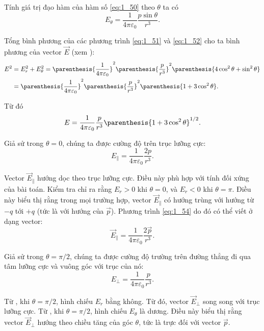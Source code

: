 \noindent
Tính giá trị đạo hàm của hàm số \eqref{eq:1_50} theo $\theta$ ta có
\begin{equation}\label{eq:1_52}
	E_{\theta} = \frac{1}{4\pi\varepsilon_0} \frac{p\sin\theta}{r^3}.
\end{equation}

\noindent
Tổng bình phương của các phương trình \eqref{eq:1_51} và \eqref{eq:1_52} cho ta bình phương của vector $\vec{E}$ (xem ):
\begin{align*}
	E^2 &= E_r^2 + E_{\theta}^2 = \parenthesis{\frac{1}{4\pi\varepsilon_0}}^2 \parenthesis{\frac{p}{r^3}}^2 \parenthesis{4\cos^2\theta + \sin^2\theta}\\
		&= \parenthesis{\frac{1}{4\pi\varepsilon_0}}^2 \parenthesis{\frac{p}{r^3}}^2 \parenthesis{1 + 3\cos^2\theta}.
\end{align*}

\noindent
Từ đó
\begin{equation}\label{eq:1_53}
	E = \frac{1}{4\pi\varepsilon_0} \frac{p}{r^3} \parenthesis{1 + 3\cos^2\theta}^{1/2}.
\end{equation}

Giả sử trong  $\theta=0$, chúng ta được cường độ trên trục lưỡng cực:
\begin{equation}\label{eq:1_54}
	E_{\parallel} = \frac{1}{4\pi\varepsilon_0} \frac{2p}{r^3}.
\end{equation}

\noindent
Vector $\vec{E}_{\parallel}$ hướng dọc theo trục lưỡng cực. Điều này phù hợp với tính đối xứng của bài toán. Kiểm tra  chỉ ra rằng $E_r>0$ khi $\theta=0$, và $E_r<0$ khi $\theta=\pi$. Điều này biểu thị rằng trong mọi trường hợp, vector $\vec{E}_{\parallel}$ có hướng trùng với hướng từ $-q$ tới $+q$ (tức là với hướng của $\vec{p}$). Phương trình \eqref{eq:1_54} do đó có thể viết ở dạng vector:
\begin{equation}\label{eq:1_55}
	\vec{E}_{\parallel} = \frac{1}{4\pi\varepsilon_0} \frac{2\vec{p}}{r^3}.
\end{equation}

Giả sử trong  $\theta=\pi/2$, chúng ta được cường độ trường trên đường thẳng đi qua tâm lưỡng cực và vuông góc với trục của nó:
\begin{equation}\label{eq:1_56}
	E_{\perp} = \frac{1}{4\pi\varepsilon_0} \frac{p}{r^3}.
\end{equation}

\noindent
Từ , khi $\theta=\pi/2$, hình chiếu $E_r$ bằng không. Từ đó, vector $\vec{E}_{\perp}$ song song với trục lưỡng cực. Từ , khi $\theta=\pi/2$, hình chiếu $E_{\theta}$ là dương. Điều này biểu thị rằng vector $\vec{E}_{\perp}$ hướng theo chiều tăng của góc $\theta$, tức là trực đối với vector $\vec{p}$.

